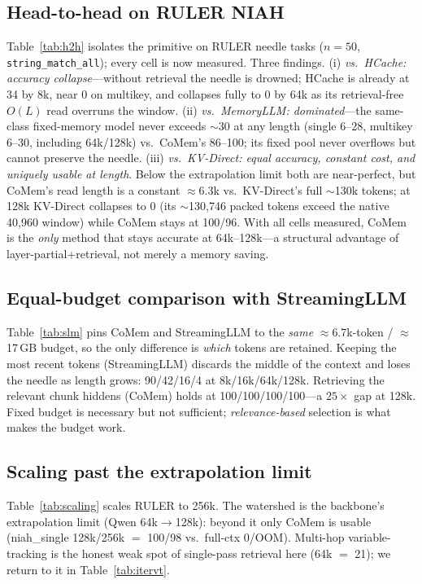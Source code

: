 \subsection{Head-to-head on RULER NIAH}
Table~\ref{tab:h2h} isolates the primitive on RULER needle tasks ($n{=}50$,
\texttt{string\_match\_all}); every cell is now measured. Three findings. (i)
\emph{vs.\ HCache: accuracy collapse}---without retrieval the needle is drowned;
HCache is already at 34 by 8k, near 0 on multikey, and collapses fully to 0 by
64k as its retrieval-free $O(L)$ read overruns the window. (ii) \emph{vs.\
MemoryLLM: dominated}---the same-class fixed-memory model never exceeds $\sim$30
at any length (single 6--28, multikey 6--30, including 64k/128k) vs.\ CoMem's
86--100; its fixed pool never overflows but cannot preserve the needle. (iii)
\emph{vs.\ KV-Direct: equal accuracy, constant cost, and uniquely usable at
length}. Below the extrapolation limit both are near-perfect, but CoMem's read
length is a constant $\approx$6.3k vs.\ KV-Direct's full $\sim$130k tokens; at
128k KV-Direct collapses to 0 (its $\sim$130{,}746 packed tokens exceed the
native 40{,}960 window) while CoMem stays at 100/96. With all cells measured,
CoMem is the \emph{only} method that stays accurate at 64k--128k---a structural
advantage of layer-partial{+}retrieval, not merely a memory saving.



\subsection{Equal-budget comparison with StreamingLLM}
Table~\ref{tab:slm} pins CoMem and StreamingLLM to the \emph{same}
$\approx$6.7k-token / $\approx$17\,GB budget, so the only difference is
\emph{which} tokens are retained. Keeping the most recent tokens
(StreamingLLM) discards the middle of the context and loses the needle as
length grows: 90/42/16/4 at 8k/16k/64k/128k. Retrieving the relevant chunk
hiddens (CoMem) holds at 100/100/100/100---a $25\times$ gap at 128k. Fixed budget
is necessary but not sufficient; \emph{relevance-based} selection is what makes
the budget work.



\subsection{Scaling past the extrapolation limit}
Table~\ref{tab:scaling} scales RULER to 256k. The watershed is the backbone's
extrapolation limit (Qwen 64k$\to$128k): beyond it only CoMem is usable
(niah\_single 128k/256k $=$ 100/98 vs.\ full-ctx 0/OOM). Multi-hop
variable-tracking is the honest weak spot of single-pass retrieval here
(64k $=$ 21); we return to it in Table~\ref{tab:itervt}.

